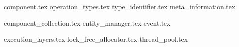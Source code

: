 {component.tex}
{operation_types.tex}
{type_identifier.tex}
{meta_information.tex}

{component_collection.tex}
{entity_manager.tex}
{event.tex}

{execution_layers.tex}
{lock_free_allocator.tex}
{thread_pool.tex}
